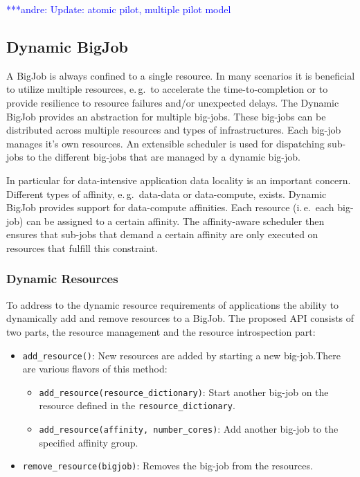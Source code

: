 \documentclass[]{article}
\newcommand{\alnote}[1]{ {\textcolor{blue} { ***andre: #1 }}}
\newcommand{\alnote}[1]{}
\begin{document}
\alnote{Update: atomic pilot, multiple pilot model}


\subsection{Dynamic BigJob}
\label{sec:dynamic_bigjob}
A BigJob is always confined to a single resource. In many scenarios it is
beneficial to utilize multiple resources, e.\,g.\ to accelerate the
time-to-completion or to provide resilience to resource failures and/or
unexpected delays. The Dynamic BigJob provides an abstraction for multiple
big-jobs. These big-jobs can be distributed across multiple resources and types
of infrastructures. Each big-job manages it's own resources. An extensible
scheduler is used for dispatching sub-jobs to the different big-jobs that are
managed by a dynamic big-job.



In particular for data-intensive application data locality is an important
concern. Different types of affinity, e.\,g.\ data-data or data-compute, exists.
Dynamic BigJob provides support for data-compute affinities. Each resource
(i.\,e.\ each big-job) can be assigned to a certain affinity. The affinity-aware
scheduler then ensures that sub-jobs that demand a certain affinity are only
executed on resources that fulfill this constraint.


\subsubsection{Dynamic Resources}

To address to the dynamic resource requirements of applications the ability to
dynamically add and remove resources to a BigJob. The proposed API consists of
two parts, the resource management and the resource introspection part:
\begin{itemize}
    \item \texttt{add\_resource()}: New resources are added by starting a new
    big-job.There are various flavors of this method:
    \begin{itemize}
        \item \texttt{add\_resource(re\-sour\-ce\_dic\-tionary)}: Start another big-job on the resource defined in the \texttt{resource\_dictionary}.
        \item \texttt{add\_resource(affinity, number\_cores)}: Add another big-job to the specified affinity group.
    \end{itemize}
    \item \texttt{remove\_resource(bigjob)}: Removes the big-job from the
    resources.
\end{itemize}
\end{document}
